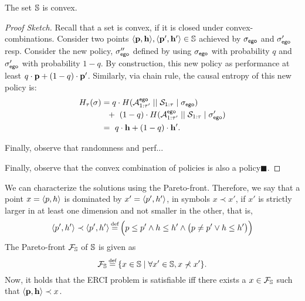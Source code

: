\begin{example}
	
\end{example}

\begin{proposition}
  The set $\mathbb{S}$ is convex. 
\end{proposition}
\begin{proof}[Proof Sketch]
  Recall that a set is convex, if it is closed under
  convex-combinations\footnotemark. Consider two points
  $\langle \mathbf{p}, \mathbf{h} \rangle, \langle \mathbf{p}',
  \mathbf{h}' \rangle \in \mathbb{S}$ achieved by ${\sigma_{\mathsf{ego}}}$ and
  ${\sigma'_{\mathsf{ego}}}$ resp. Consider the new policy,
  ${\sigma''_{\mathsf{ego}}}$ defined by using ${\sigma_{\mathsf{ego}}}$ with
  probability $q$ and ${\sigma'_{\mathsf{ego}}}$ with probability $1 - q$.
  By construction, this new policy as performance at least $q\cdot \mathbf{p} + (1 - q)\cdot \mathbf{p}'$.
  Similarly, via chain rule, the causal entropy of this new policy is:
  \begin{equation}
    \begin{split}
      H_\tau(\sigma) &= q \cdot H( {\mathcal{A}}^{\mathsf{ego}}_{1:\tau'} \mid\mid {\mathcal{S}}_{1:\tau} \mid {\sigma_{\mathsf{ego}}}) \\
      &~~+ ~(1 - q)  \cdot H( {\mathcal{A}}^{\mathsf{ego}}_{1:\tau'} \mid\mid {\mathcal{S}}_{1:\tau} \mid {\sigma'_{\mathsf{ego}}})\\
      &=~q\cdot\mathbf{h} + (1 - q)\cdot \mathbf{h}'.
    \end{split}
  \end{equation}
  
  Finally, observe that randomness and perf...

  Finally, observe that the convex combination of policies is also a
  policy\hfill $\blacksquare$.
\end{proof}


We can characterize the solutions using the Pareto-front. Therefore, we say that a point $x = \langle p,h \rangle$ is dominated by $x' = \langle p', h' \rangle$, in symbols $x \prec x'$, if $x'$ is strictly larger in at least one dimension and not smaller in the other, that is, 
\begin{equation}
  \langle \scp', \rndp' \rangle 	 \prec \langle \scp', \rndp' \rangle \eqdef \Big( \scp \leq \scp' \land \rndp \leq \rndp' \land \big(\scp \neq \scp' \lor \rndp \leq \rndp'\big)	\Big)
\end{equation}
The Pareto-front $\mathcal{F}_{\mathbb{S}}$ of $\mathbb{S}$ is given as \[ \pareto{\solutions} \eqdef \{ x \in \solutions \mid \forall x' \in \solutions, x \not\prec x'  \}. \]
Now, it holds that the ERCI problem is satisfiable iff there exists a  $x \in \mathcal{F}_{\mathbb{S}}$ such that $\langle \mathbf{p}, \mathbf{h} \rangle \prec x$.  

